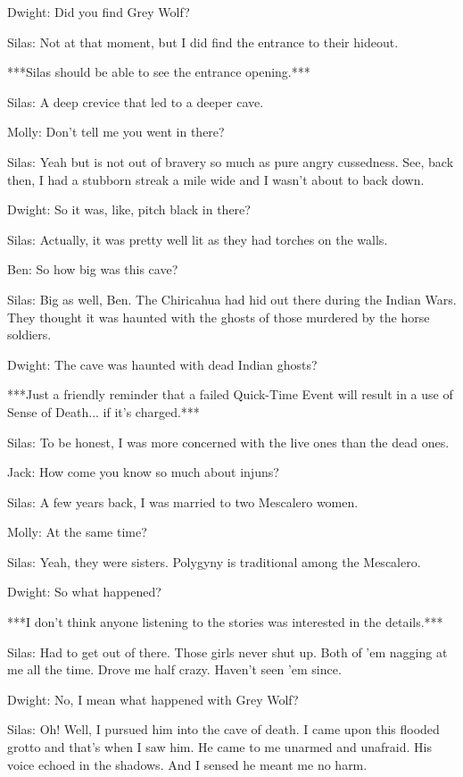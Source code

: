 \documentclass{article}
\begin{document}
Dwight: Did you find Grey Wolf?

Silas: Not at that moment, but I did find the entrance to their hideout.

***Silas should be able to see the entrance opening.***

Silas: A deep crevice that led to a deeper cave.

Molly: Don't tell me you went in there?

Silas: Yeah but is not out of bravery so much as pure angry cussedness. See, back then, I had a stubborn streak a mile wide and I wasn't about to back down.

Dwight: So it was, like, pitch black in there?

Silas: Actually, it was pretty well lit as they had torches on the walls.

Ben: So how big was this cave?

Silas: Big as well, Ben. The Chiricahua had hid out there during the Indian Wars. They thought it was haunted with the ghosts of those murdered by the horse soldiers.

Dwight: The cave was haunted with dead Indian ghosts?

***Just a friendly reminder that a failed Quick-Time Event will result in a use of Sense of Death... if it's 
charged.***

Silas: To be honest, I was more concerned with the live ones than the dead ones.

Jack: How come you know so much about injuns?

Silas: A few years back, I was married to two Mescalero women.

Molly: At the same time?

Silas: Yeah, they were sisters. Polygyny is traditional among the Mescalero.

Dwight: So what happened?

***I don't think anyone listening to the stories was interested in the details.***

Silas: Had to get out of there. Those girls never shut up. Both of 'em nagging at me all the time. Drove me half crazy. Haven't seen 'em since.

Dwight: No, I mean what happened with Grey Wolf?

Silas: Oh! Well, I pursued him into the cave of death. I came upon this flooded grotto and that's when I saw him. He came to me unarmed and unafraid. His voice echoed in the shadows. And I sensed he meant me no harm.
\end{document}
